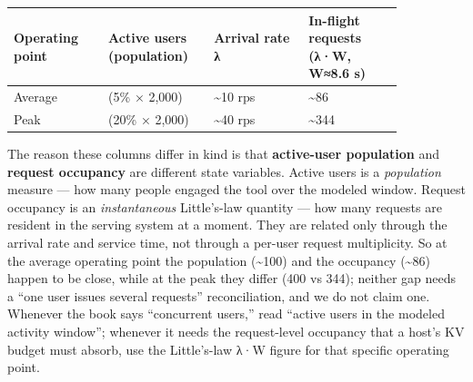 \nopagebreak[4]
\begin{longtable}[]{@{}
  >{\raggedright\arraybackslash}p{0.2127\linewidth}
  >{\raggedright\arraybackslash}p{0.2127\linewidth}
  >{\raggedright\arraybackslash}p{0.2127\linewidth}
  >{\raggedright\arraybackslash}p{0.2127\linewidth}@{}}
\toprule\noalign{}
\begin{minipage}[b]{\linewidth}\raggedright
Operating point
\end{minipage} & \begin{minipage}[b]{\linewidth}\raggedright
Active users (population)
\end{minipage} & \begin{minipage}[b]{\linewidth}\raggedright
Arrival rate λ
\end{minipage} & \begin{minipage}[b]{\linewidth}\raggedright
In-flight requests (λ·W, W≈8.6 s)
\end{minipage} \\
\midrule\noalign{}
\endhead
\bottomrule\noalign{}
\endlastfoot
Average & 100 (5\% × 2,000) & \textasciitilde10 rps &
\textasciitilde86 \\
\noalign{\label{tab:4.5}}
Peak & 400 (20\% × 2,000) & \textasciitilde40 rps &
\textasciitilde344 \\
\end{longtable}

The reason these columns differ in kind is that \textbf{active-user
population} and \textbf{request occupancy} are different state
variables. Active users is a \emph{population} measure --- how many
people engaged the tool over the modeled window. Request occupancy is an
\emph{instantaneous} Little's-law quantity --- how many requests are
resident in the serving system at a moment. They are related only
through the arrival rate and service time, not through a per-user
request multiplicity. So at the average operating point the population
(\textasciitilde100) and the occupancy (\textasciitilde86) happen to be
close, while at the peak they differ (400 vs 344); neither gap needs a
``one user issues several requests'' reconciliation, and we do not claim
one. Whenever the book says ``concurrent users,'' read ``active users in
the modeled activity window''; whenever it needs the request-level
occupancy that a host's KV budget must absorb, use the Little's-law λ·W
figure for that specific operating point.

